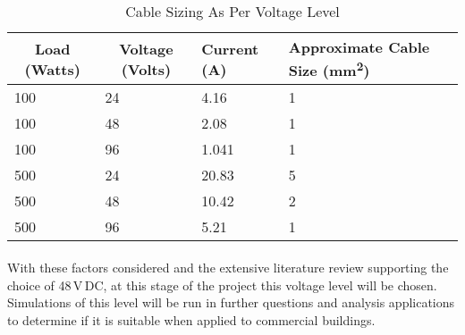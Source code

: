 \begin{table}[H]
\centering
\begin{tabular}{|l|l|l|p{5cm}|}
\hline
\multicolumn{1}{|c|}{\textbf{Load (Watts)}} & \multicolumn{1}{c|}{\textbf{Voltage (Volts)}} & \textbf{Current (A)} & \textbf{Approximate Cable Size (\si{mm^2})} \\ \hline
100 & 24 & 4.16 & 1 \\ \hline
100 & 48 & 2.08 & 1 \\ \hline
100 & 96 & 1.041 & 1 \\ \hline
500 & 24 & 20.83 & 5 \\ \hline
500 & 48 & 10.42 & 2 \\ \hline
500 & 96 & 5.21 & 1 \\ \hline
\end{tabular}
\caption{Cable Sizing As Per Voltage Level}
\label{table:lvdc-cables}
\end{table} 

\paragraph{}
With these factors considered and the extensive literature review supporting the choice of 48\,V\,DC, at this stage of the project this voltage level will be chosen. Simulations of this level will be run in further questions and analysis applications to determine if it is suitable when applied to commercial buildings.  

   

